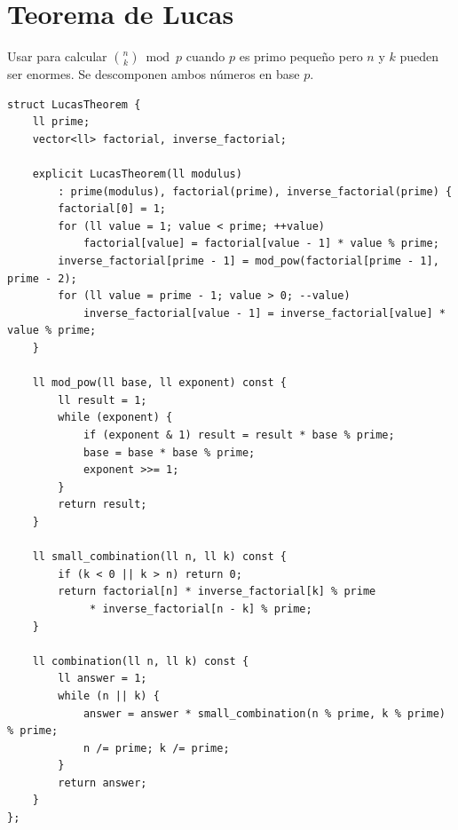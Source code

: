 \section{Teorema de Lucas}

Usar para calcular $\binom nk\bmod p$ cuando $p$ es primo peque\~no pero $n$ y
$k$ pueden ser enormes. Se descomponen ambos n\'umeros en base $p$.


\begin{lstlisting}[style=cpp]
struct LucasTheorem {
    ll prime;
    vector<ll> factorial, inverse_factorial;

    explicit LucasTheorem(ll modulus)
        : prime(modulus), factorial(prime), inverse_factorial(prime) {
        factorial[0] = 1;
        for (ll value = 1; value < prime; ++value)
            factorial[value] = factorial[value - 1] * value % prime;
        inverse_factorial[prime - 1] = mod_pow(factorial[prime - 1], prime - 2);
        for (ll value = prime - 1; value > 0; --value)
            inverse_factorial[value - 1] = inverse_factorial[value] * value % prime;
    }

    ll mod_pow(ll base, ll exponent) const {
        ll result = 1;
        while (exponent) {
            if (exponent & 1) result = result * base % prime;
            base = base * base % prime;
            exponent >>= 1;
        }
        return result;
    }

    ll small_combination(ll n, ll k) const {
        if (k < 0 || k > n) return 0;
        return factorial[n] * inverse_factorial[k] % prime
             * inverse_factorial[n - k] % prime;
    }

    ll combination(ll n, ll k) const {
        ll answer = 1;
        while (n || k) {
            answer = answer * small_combination(n % prime, k % prime) % prime;
            n /= prime; k /= prime;
        }
        return answer;
    }
};
\end{lstlisting}

